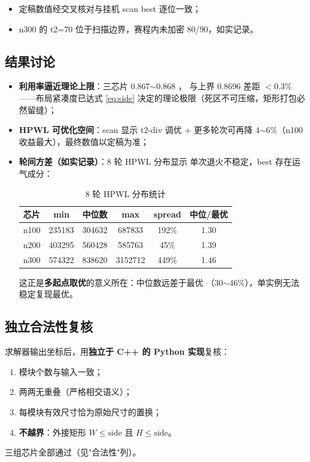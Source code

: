 \documentclass[12pt,a4paper]{article}
\begin{document}
\begin{itemize}
    \item 定稿数值经交叉核对与挂机 scan best 逐位一致；
    \item n300 的 t2=70 位于扫描边界，赛程内未加密 80/90，如实记录。
\end{itemize}

\subsection{结果讨论}

\begin{itemize}
    \item \textbf{利用率逼近理论上限}：三芯片 0.867$\sim$0.868 ，
    与上界 0.8696 差距 $< 0.3\%$——布局紧凑度已达式 \eqref{eq:side}
    决定的理论极限（死区不可压缩，矩形打包必然留缝）；
    \item \textbf{HPWL 可优化空间}：scan 显示 t2-div 调优 + 更多轮次可再降
    4$\sim$6\%（n100 收益最大），最终数值以定稿为准；
    \item \textbf{轮间方差（如实记录）}：8 轮 HPWL 分布显示
    单次退火不稳定，best 存在运气成分：

    \begin{table}[H]
    \centering
    \small
    \caption{8 轮 HPWL 分布统计}
    \begin{tabular}{lccccc}
    \toprule
    芯片 & min & 中位数 & max & spread & 中位/最优 \\
    \midrule
    n100 & 235183 & 304632 & 687833 & 192\% & 1.30 \\
    n200 & 403295 & 560428 & 585763 & 45\% & 1.39 \\
    n300 & 574322 & 838620 & 3152712 & 449\% & 1.46 \\
    \bottomrule
    \end{tabular}
    \end{table}

    这正是\textbf{多起点取优}的意义所在：中位数远差于最优
    （30$\sim$46\%），单实例无法稳定复现最优。
\end{itemize}

\subsection{独立合法性复核}

求解器输出坐标后，用\textbf{独立于 C++ 的 Python 实现}复核：
\begin{enumerate}
    \item 模块个数与输入一致；
    \item 两两无重叠（严格相交语义）；
    \item 每模块有效尺寸恰为原始尺寸的置换；
    \item \textbf{不越界}：外接矩形 $W \le \text{side}$ 且 $H \le \text{side}$。
\end{enumerate}
三组芯片全部通过（见"合法性"列）。
\end{document}
